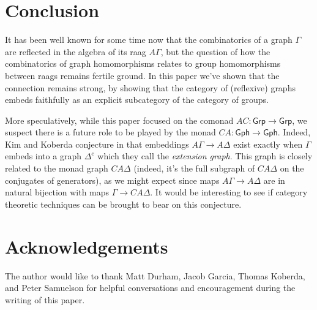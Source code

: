 \documentclass[12pt]{article}
\theoremstyle{definition}
\theoremstyle{theorem}
\newcommand*{\catFont}[1]{\mathsf{#1}}
\newcommand{\Grp}{\catFont{Grp}}
\begin{document}

\section{Conclusion}
\label{conclusion}

It has been well known for some time now that the combinatorics of a graph
$\Gamma$ are reflected in the algebra of its raag $A\Gamma$, but the 
question of how the combinatorics of graph homomorphisms relates to 
group homomorphisms between raags remains fertile ground. In this paper we've 
shown that the connection remains strong, by showing that the category of
(reflexive) graphs embeds faithfully as an explicit subcategory of 
the category of groups. 

More speculatively, while this paper focused on the comonad $AC : \Grp \to \Grp$,
we suspect there is a future role to be played by the monad 
$CA : \mathsf{Gph} \to \mathsf{Gph}$. Indeed, Kim and Koberda conjecture 
in \cite{kimEmbedabilityRightangledArtin2013} that embeddings 
$A\Gamma \to A \Delta$ exist exactly when $\Gamma$ embeds into a 
graph $\Delta^e$ which they call the \emph{extension graph}.
This graph is closely related to the monad graph $CA\Delta$
(indeed, it's the full subgraph of $CA\Delta$ on the conjugates of generators),
as we might expect since
maps $A\Gamma \to A \Delta$ are in natural bijection with maps 
$\Gamma \to CA \Delta$. It would be interesting to see if category theoretic
techniques can be brought to bear on this conjecture.

\section*{Acknowledgements}

The author would like to thank Matt Durham, Jacob Garcia, Thomas Koberda, and 
Peter Samuelson for helpful conversations and encouragement during the 
writing of this paper.


\newpage
\nocite{*}


\end{document}
